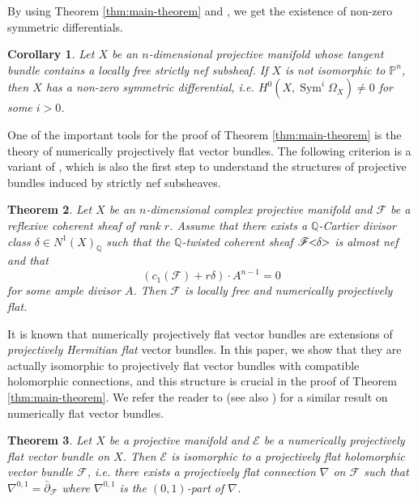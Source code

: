 \documentclass[english,reqno]{amsart}
\newcommand\bbP{{\mathbb P}}
\newcommand\bbQ{{\mathbb Q}}
\newcommand\sE{{\mathscr E}}
\newcommand\sF{{\mathscr F}}
\DeclareMathOperator*{\Sym}{Sym}
\theoremstyle{plain}
\newtheorem{thm}{Theorem}[section]
\newtheorem{cor}[thm]{Corollary}
\theoremstyle{definition}
\numberwithin{equation}{section} %
\begin{document}
 By using Theorem \ref{thm:main-theorem} and \cite[Theorem~0.1]{BrunebarbeKlinglerTotaro2013}, we get the existence of non-zero symmetric differentials.

\begin{cor}
    \label{cor:existence-symmetric-forms}
    Let $X$ be an $n$-dimensional projective manifold whose tangent bundle contains a  locally free strictly nef subsheaf. If $X$ is not isomorphic to $\bbP^n$, then $X$ has a non-zero symmetric differential, i.e. $H^0(X,\Sym^i\Omega_X)\not=0$ for some $i>0$.
\end{cor}





One of the important tools for the proof of Theorem
\ref{thm:main-theorem} is the theory of numerically projectively
flat vector bundles. The following criterion is  a variant of \cite[Theorem 1.8]{HoeringPeternell2019}, which is also the first step to understand the structures of projective bundles induced by strictly nef subsheaves.

\begin{thm}
    \label{Num-Projectily-flatness-criterion}
    Let $X$ be an $n$-dimensional complex projective manifold and  $\sF$ be a reflexive coherent sheaf of rank $r$. Assume that there exists a $\bbQ$-Cartier divisor class $\delta\in N^1(X)_{\bbQ}$  such that the $\mathbb{Q}$-twisted coherent sheaf $\sF\hspace{-0.8ex}<\hspace{-0.8ex}\delta\hspace{-0.8ex}>$ is almost nef and that
    \[
    (c_1(\sF)+r\delta)\cdot A^{n-1}=0
    \]
    for some ample divisor $A$. Then $\sF$ is locally free and numerically projectively flat.
\end{thm}

It is known that  numerically projectively flat vector bundles are
extensions of \emph{projectively Hermitian flat} vector bundles. In
this paper, we show that they are actually isomorphic to
projectively flat vector bundles with compatible holomorphic
connections, and this structure is crucial in the proof of Theorem
\ref{thm:main-theorem}. We refer the reader to \cite[Section 3]{Simpson1992} (see also \cite{Deng2018}) for a similar result on numerically flat vector bundles.


\begin{thm}\label{thm:num-proj-flat=proj-flat}
    Let $X$ be a projective manifold and $\sE$ be a numerically projectively flat vector bundle on $X$. Then $\sE$ is isomorphic to a  projectively flat holomorphic vector bundle
    $\sF$, i.e. there exists a projectively flat connection $\nabla$
    on $\sF$ such that  $\nabla^{0,1}=\bar\partial_{\sF}$ where
    $\nabla^{0,1}$ is the $(0,1)$-part of $\nabla$.
\end{thm}
\end{document}
